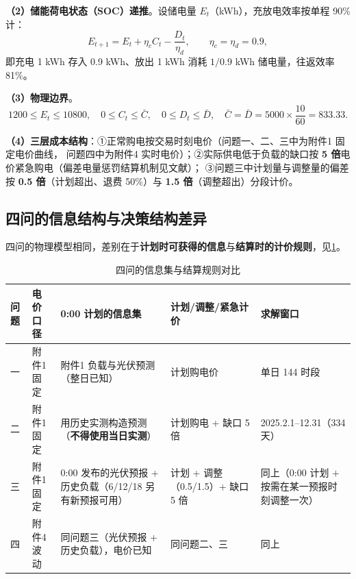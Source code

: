 \documentclass[withoutpreface,bwprint]{cumcmthesis}
\begin{document}
\textbf{（2）储能荷电状态（SOC）递推}。设储电量 $E_t$（kWh），充放电效率按单程 90\% 计：
\begin{equation}
E_{t+1} = E_t + \eta_c C_t - \frac{D_t}{\eta_d}, \qquad \eta_c=\eta_d=0.9 ,
\label{eq:soc}
\end{equation}
即充电 1 kWh 存入 0.9 kWh、放出 1 kWh 消耗 $1/0.9$ kWh 储电量，往返效率 81\%。

\textbf{（3）物理边界}。
\begin{equation}
1200 \le E_t \le 10800,\quad 0\le C_t \le \bar C,\quad 0\le D_t \le \bar D,\quad \bar C=\bar D=5000\times\frac{10}{60}=833.33 .
\label{eq:bounds}
\end{equation}

\textbf{（4）三层成本结构}：①正常购电按交易时刻电价（问题一、二、三中为附件1 固定电价曲线，
问题四中为附件4 实时电价）；②实际供电低于负载的缺口按 \textbf{5 倍}电价紧急购电（偏差电量惩罚结算机制见文献\cite{cn111260354}）；
③问题三中计划量与调整量的偏差按 \textbf{0.5 倍}（计划超出、退费 50\%）与
\textbf{1.5 倍}（调整超出）分段计价。

\textbf{}\subsection{四问的信息结构与决策结构差异}

四问的物理模型相同，差别在于\textbf{计划时可获得的信息}与\textbf{结算时的计价规则}，见\cref{tab:info}。

\begin{table}[htbp]
\centering
\caption{四问的信息集与结算规则对比}
\label{tab:info}
\begin{tabularx}{\textwidth}{@{}p{0.8cm}p{2.0cm}p{4.4cm}p{3.4cm}X@{}}
\toprule
问题 & 电价口径 & 0:00 计划的信息集 & 计划/调整/紧急计价 & 求解窗口 \\
\midrule
一 & 附件1 固定 & 附件1 负载与光伏预测（整日已知） & 计划购电价 & 单日 144 时段 \\
二 & 附件1 固定 & 用历史实测构造预测（\textbf{不得使用当日实测}） & 计划购电 + 缺口 5 倍 & 2025.2.1--12.31（334 天） \\
三 & 附件1 固定 & 0:00 发布的光伏预报 + 历史负载（6/12/18 另有新预报可用） & 计划 + 调整（0.5/1.5）+ 缺口 5 倍 & 同上（0:00 计划 $+$ 按需在某一预报时刻调整一次） \\
四 & 附件4 波动 & 同问题三（光伏预报 + 历史负载），电价已知 & 同问题二、三 & 同上 \\
\bottomrule
\end{tabularx}
\end{table}
\end{document}
